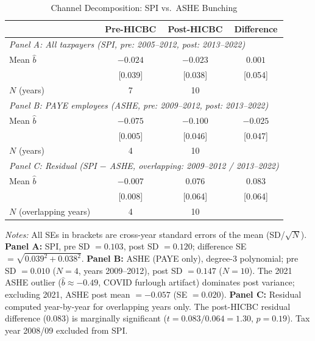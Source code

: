 \documentclass[12pt]{article}
\newcommand{\bhat}{\hat{b}}
\begin{document}
\begin{table}[H]
\centering
\caption{Channel Decomposition: SPI vs.\ ASHE Bunching}
\label{tab:channels}
\begin{threeparttable}
\begin{tabular}{lccc}
\toprule
& Pre-HICBC & Post-HICBC & Difference \\
\midrule
\multicolumn{4}{l}{\emph{Panel A: All taxpayers (SPI, pre: 2005--2012, post: 2013--2022)}} \\
Mean $\bhat$ & $-0.024$ & $-0.023$ & $0.001$ \\
& [0.039] & [0.038] & [0.054] \\
$N$ (years) & 7 & 10 & \\[0.5em]
\multicolumn{4}{l}{\emph{Panel B: PAYE employees (ASHE, pre: 2009--2012, post: 2013--2022)}} \\
Mean $\bhat$ & $-0.075$ & $-0.100$ & $-0.025$ \\
& [0.005] & [0.046] & [0.047] \\
$N$ (years) & 4 & 10 & \\[0.5em]
\multicolumn{4}{l}{\emph{Panel C: Residual (SPI $-$ ASHE, overlapping: 2009--2012 / 2013--2022)}} \\
Mean $\bhat$ & $-0.007$ & $0.076$ & $0.083$ \\
& [0.008] & [0.064] & [0.064] \\
$N$ (overlapping years) & 4 & 10 & \\
\bottomrule
\end{tabular}
\begin{tablenotes}[flushleft]
\small
\item \emph{Notes:} All SEs in brackets are cross-year standard errors of the mean (SD/$\sqrt{N}$). \textbf{Panel A:} SPI, pre SD $= 0.103$, post SD $= 0.120$; difference SE $= \sqrt{0.039^2 + 0.038^2}$. \textbf{Panel B:} ASHE (PAYE only), degree-3 polynomial; pre SD $= 0.010$ ($N=4$, years 2009--2012), post SD $= 0.147$ ($N=10$). The 2021 ASHE outlier ($\bhat \approx -0.49$, COVID furlough artifact) dominates post variance; excluding 2021, ASHE post mean $= -0.057$ (SE $= 0.020$). \textbf{Panel C:} Residual computed year-by-year for overlapping years only. The post-HICBC residual difference (0.083) is marginally significant ($t = 0.083/0.064 = 1.30$, $p = 0.19$). Tax year 2008/09 excluded from SPI.
\end{tablenotes}
\end{threeparttable}
\end{table}
\end{document}
